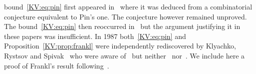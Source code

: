 \documentclass{irmaart}
\theoremstyle{plain}
\begin{document}
bound~\eqref{KV:eq:pin} first appeared in~\cite{Fischler&Tannenbaum:1970} where
it was deduced from a combinatorial conjecture equivalent to Pin's one. The
conjecture however remained unproved. The bound~\eqref{KV:eq:pin} then
reoccurred in~\cite{Kohavi&Winograd:1971,Kohavi&Winograd:1973} but the argument
justifying it in these papers was insufficient. In 1987 both~\eqref{KV:eq:pin}
and Proposition~\ref{KV:prop:frankl} were independently rediscovered by
Klyachko, Rystsov and Spivak~\cite{Klyachko&Rystsov&Spivak:1987} who were aware
of~\cite{Fischler&Tannenbaum:1970,Kohavi&Winograd:1971,Kohavi&Winograd:1973}
but
neither~\cite{Pin:1983} nor~\cite{Frankl:1982}. We include here a proof of Frankl's result
following~\cite{Klyachko&Rystsov&Spivak:1987}.
\end{document}
